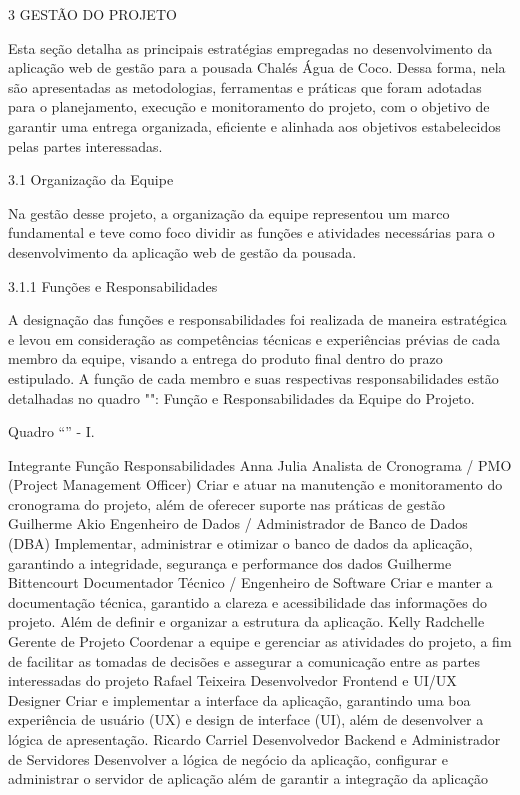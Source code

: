 3 GESTÃO DO PROJETO
        
Esta seção detalha as principais estratégias empregadas no desenvolvimento da aplicação web de gestão para a pousada Chalés Água de Coco. Dessa forma, nela são apresentadas as metodologias, ferramentas e práticas que foram adotadas para o planejamento, execução e monitoramento do projeto, com o objetivo de garantir uma entrega organizada, eficiente e alinhada aos objetivos estabelecidos pelas partes interessadas.


3.1 Organização da Equipe


        Na gestão desse projeto, a organização da equipe representou um marco fundamental e teve como foco dividir as funções e atividades necessárias para o desenvolvimento da aplicação web de gestão da pousada. 


3.1.1 Funções e Responsabilidades


        A designação das funções e responsabilidades foi realizada de maneira estratégica e levou em consideração as competências técnicas e experiências prévias de cada membro da equipe, visando a entrega do produto final dentro do prazo estipulado.         A função de cada membro e suas respectivas responsabilidades estão detalhadas no quadro "": Função e Responsabilidades da Equipe do Projeto.        


                Quadro “” - I.        


Integrante
	Função
	Responsabilidades
	Anna Julia
	Analista de Cronograma / PMO (Project Management Officer) 
	Criar e atuar na manutenção e monitoramento do cronograma do projeto, além de oferecer suporte nas práticas de gestão 
	Guilherme Akio
	Engenheiro de Dados / Administrador de Banco de Dados (DBA) 
	Implementar, administrar  e otimizar o banco de dados da aplicação, garantindo a integridade, segurança e performance dos dados
	Guilherme Bittencourt
	Documentador Técnico / Engenheiro de Software
	Criar e manter a documentação técnica, garantido a clareza e acessibilidade das informações do projeto. Além de definir e organizar a estrutura da aplicação.
	Kelly Radchelle
	Gerente de Projeto 
	Coordenar a equipe e gerenciar as atividades  do projeto, a fim de facilitar as tomadas de decisões e  assegurar a comunicação entre as partes interessadas do projeto 
	Rafael Teixeira
	Desenvolvedor Frontend e UI/UX Designer 
	Criar e implementar a interface da aplicação, garantindo uma boa  experiência de usuário (UX)  e design de interface (UI), além de desenvolver a lógica de apresentação.
	Ricardo Carriel
	Desenvolvedor Backend e Administrador de Servidores 
	Desenvolver a lógica de negócio da aplicação, configurar e administrar o servidor de aplicação  além de garantir a integração da aplicação
	                        
